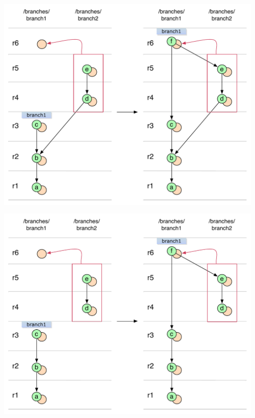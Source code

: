 \begin{center}
\includegraphics[width=\textwidth]{img/diagrams/simple_merge_svn_to_git.pdf}%
\label{simple_merge_svn_to_git}%
\end{center}

\begin{center}
\includegraphics[width=\textwidth]{img/diagrams/simple_merge_branch_no_parent_svn_to_git.pdf}%
\label{simple_merge_branch_no_parent_svn_to_git}%
\end{center}

